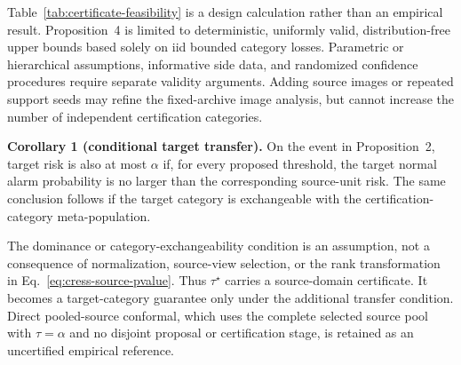 

Table~\ref{tab:certificate-feasibility} is a design calculation rather than an empirical result. Proposition~4 is limited to deterministic, uniformly valid, distribution-free upper bounds based solely on iid bounded category losses. Parametric or hierarchical assumptions, informative side data, and randomized confidence procedures require separate validity arguments. Adding source images or repeated support seeds may refine the fixed-archive image analysis, but cannot increase the number of independent certification categories.

\noindent\textbf{Corollary 1 (conditional target transfer).} On the event in Proposition~2, target risk is also at most $\alpha$ if, for every proposed threshold, the target normal alarm probability is no larger than the corresponding source-unit risk. The same conclusion follows if the target category is exchangeable with the certification-category meta-population.

The dominance or category-exchangeability condition is an assumption, not a consequence of normalization, source-view selection, or the rank transformation in Eq.~\eqref{eq:cress-source-pvalue}. Thus $\tau^\star$ carries a source-domain certificate. It becomes a target-category guarantee only under the additional transfer condition. Direct pooled-source conformal, which uses the complete selected source pool with $\tau=\alpha$ and no disjoint proposal or certification stage, is retained as an uncertified empirical reference.
